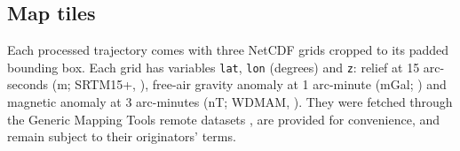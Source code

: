 \begin{table}[p]
\centering
\caption{The processed trajectories. \emph{Speed} is the median GNSS speed, \emph{Fixes} the number of rows with a GNSS fix, and \emph{Fix rate} the fixes per second of trajectory. \(\sigma_h\), \(\sigma_v\) and \(\sigma_s\) are the medians of the receiver's reported horizontal, vertical and speed accuracy over those fixes. Distance is the summed great-circle distance between successive fixes.}
\label{tab:trajectories}
\scriptsize
\setlength{\tabcolsep}{3pt}

\end{table}

\subsection{Map tiles}
\label{sec:maps}

Each processed trajectory comes with three NetCDF grids cropped to its padded bounding box. Each grid has variables \texttt{lat}, \texttt{lon} (degrees) and \texttt{z}: relief at 15 arc-seconds (m; SRTM15+, \citealp{tozer2019srtm15}), free-air gravity anomaly at 1 arc-minute (mGal; \citealp{SANDWELL20211059}) and magnetic anomaly at 3 arc-minutes (nT; WDMAM, \citealp{wdmam}). They were fetched through the Generic Mapping Tools remote datasets \citep{wessel2019gmt}, are provided for convenience, and remain subject to their originators' terms.
